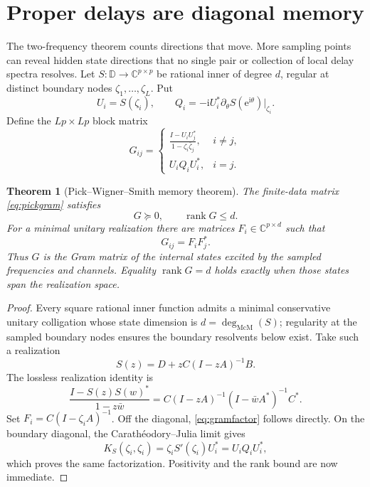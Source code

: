 \documentclass[11pt]{article}
\newtheorem{theorem}{Theorem}[section]
\theoremstyle{definition}
\theoremstyle{remark}
\newcommand{\C}{\mathbb C}
\newcommand{\D}{\mathbb D}
\newcommand{\rank}{\operatorname{rank}}
\newcommand{\e}{\mathrm e}
\newcommand{\mcdeg}{\deg_{\mathrm{McM}}}
\begin{document}
\section{Proper delays are diagonal memory}

The two-frequency theorem counts directions that move.  More sampling points
can reveal hidden state directions that no single pair or collection of local
delay spectra resolves.  Let $S:\D\to\C^{p\times p}$ be rational inner of
degree $d$, regular at distinct boundary nodes
$\zeta_1,\ldots,\zeta_L$.  Put
\begin{equation}\label{eq:boundarydata}
 U_i=S(\zeta_i),
 \qquad
 Q_i=-\mathrm iU_i^*\partial_\theta S(\e^{\mathrm i\theta})|_{\zeta_i}.
\end{equation}
Define the $Lp\times Lp$ block matrix
\begin{equation}\label{eq:pickgram}
 G_{ij}=\begin{cases}
 \displaystyle\frac{I-U_iU_j^*}{1-\zeta_i\bar\zeta_j},&i\ne j,\\[1.2ex]
 U_iQ_iU_i^*,&i=j.
 \end{cases}
\end{equation}

\begin{theorem}[Pick--Wigner--Smith memory theorem]\label{thm:pick}
The finite-data matrix \eqref{eq:pickgram} satisfies
\begin{equation}\label{eq:pickrank}
 G\succeq0,
 \qquad
 \rank G\leq d.
\end{equation}
For a minimal unitary realization there are matrices
$F_i\in\C^{p\times d}$ such that
\begin{equation}\label{eq:gramfactor}
 G_{ij}=F_iF_j^*.
\end{equation}
Thus $G$ is the Gram matrix of the internal states excited by the sampled
frequencies and channels.  Equality $\rank G=d$ holds exactly when those
states span the realization space.
\end{theorem}

\begin{proof}
Every square rational inner function admits a minimal conservative unitary
colligation whose state dimension is $d=\mcdeg(S)$; regularity at the sampled
boundary nodes ensures the boundary resolvents below exist.  Take such a
realization
\[
 S(z)=D+zC(I-zA)^{-1}B.
\]
The lossless realization identity is
\begin{equation}\label{eq:kernelidentity}
 \frac{I-S(z)S(w)^*}{1-z\bar w}
 =C(I-zA)^{-1}(I-\bar wA^*)^{-1}C^*.
\end{equation}
Set $F_i=C(I-\zeta_iA)^{-1}$.  Off the diagonal,
\eqref{eq:gramfactor} follows directly.  On the boundary diagonal, the
Carath\'eodory--Julia limit gives
\begin{equation}\label{eq:diagonalidentity}
 K_S(\zeta_i,\zeta_i)
 =\zeta_iS'(\zeta_i)U_i^*=U_iQ_iU_i^*,
\end{equation}
which proves the same factorization.  Positivity and the rank bound are now
immediate.
\end{proof}
\end{document}

